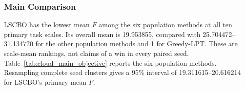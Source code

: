 \subsubsection{Main Comparison}
LSCBO has the lowest mean $F$ among the six population methods at all ten primary task scales. Its overall mean is 19.953855, compared with 25.704472--31.134720 for the other population methods and 1 for Greedy-LPT. These are scale-mean rankings, not claims of a win in every paired seed. Table~\ref{tab:cloud_main_objective} reports the six population methods. Resampling complete seed clusters gives a 95\% interval of 19.311615--20.616214 for LSCBO's primary mean $F$.
\begin{table}[!htbp]
\centering\small
\caption{Cold-start mean reference-normalized objective $F$ over 30 paired seeds at each primary task scale (lower is better). Only the six population methods are displayed; reference construction is defined in Section~\ref{sec:cloud_protocol}.}\label{tab:cloud_main_objective}
\end{table}
